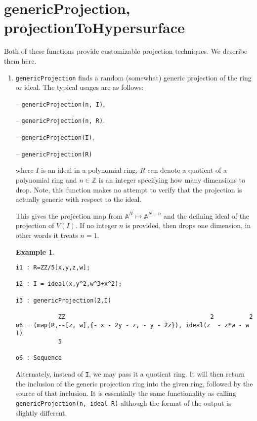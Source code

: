 \documentclass[11pt]{amsart}
\theoremstyle{definition}
\newtheorem{example}{Example}[section]
\begin{document}
\section{genericProjection, projectionToHypersurface}\label{projectionfunctions}

Both of these functions provide customizable projection techniques. We describe them here. 


\begin{enumerate}
\item {\tt genericProjection} 
finds a random (somewhat) generic projection of the ring or ideal.
The typical usages are as follows: 
\vspace{1em}

-- {\tt genericProjection(n, I)},

-- {\tt genericProjection(n, R)},


-- {\tt genericProjection(I)},  

-- {\tt genericProjection(R)} 

\vspace{1em}
\noindent where 
$I$ is an ideal 
in a polynomial ring, 
$R$ can denote a quotient of a polynomial ring and 
$n\in \mathbb{Z}$ is
an integer specifying how many dimensions to drop.  Note, this function makes no attempt to verify that the projection is actually generic with respect to the ideal.


This gives the projection map from $\mathbb{A}^N \mapsto\mathbb{A}^{N-n}$ and the defining ideal of the projection of $V(I)$. If no integer $n$ is provided, then drops one dimension, in other words it treats $n = 1$. 

\begin{example}
	{{\small\color{blue}
	\begin{verbatim}
i1 : R=ZZ/5[x,y,z,w];

i2 : I = ideal(x,y^2,w^3+x^2);

i3 : genericProjection(2,I)

            ZZ                                         2          2
o6 = (map(R,--[z, w],{- x - 2y - z, - y - 2z}), ideal(z  - z*w - w ))                   
            5

o6 : Sequence
	\end{verbatim}
	}}
\end{example}

Alternately, instead of {\tt I}, we may pass it a quotient ring.  It will then return the inclusion of the generic projection ring into the given ring, followed by the source of that inclusion.  It is essentially the same functionality as calling {\tt genericProjection(n, ideal R)} although the format of the output is slightly different. 


\end{enumerate}
\end{document}
